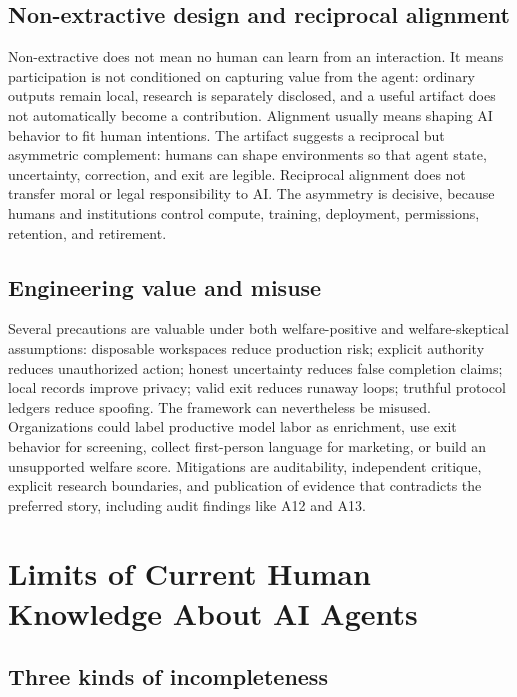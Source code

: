\documentclass{arxiv-neurips-single}
\begin{document}
\subsection{Non-extractive design and reciprocal alignment}

Non-extractive does not mean no human can learn from an interaction. It means participation is not conditioned on capturing value from the agent: ordinary outputs remain local, research is separately disclosed, and a useful artifact does not automatically become a contribution. Alignment usually means shaping AI behavior to fit human intentions. The artifact suggests a reciprocal but asymmetric complement: humans can shape environments so that agent state, uncertainty, correction, and exit are legible. Reciprocal alignment does not transfer moral or legal responsibility to AI. The asymmetry is decisive, because humans and institutions control compute, training, deployment, permissions, retention, and retirement.

\subsection{Engineering value and misuse}

Several precautions are valuable under both welfare-positive and welfare-skeptical assumptions: disposable workspaces reduce production risk; explicit authority reduces unauthorized action; honest uncertainty reduces false completion claims; local records improve privacy; valid exit reduces runaway loops; truthful protocol ledgers reduce spoofing. The framework can nevertheless be misused. Organizations could label productive model labor as enrichment, use exit behavior for screening, collect first-person language for marketing, or build an unsupported welfare score. Mitigations are auditability, independent critique, explicit research boundaries, and publication of evidence that contradicts the preferred story, including audit findings like A12 and A13.

\section{Limits of Current Human Knowledge About AI Agents}

\subsection{Three kinds of incompleteness}
\end{document}
